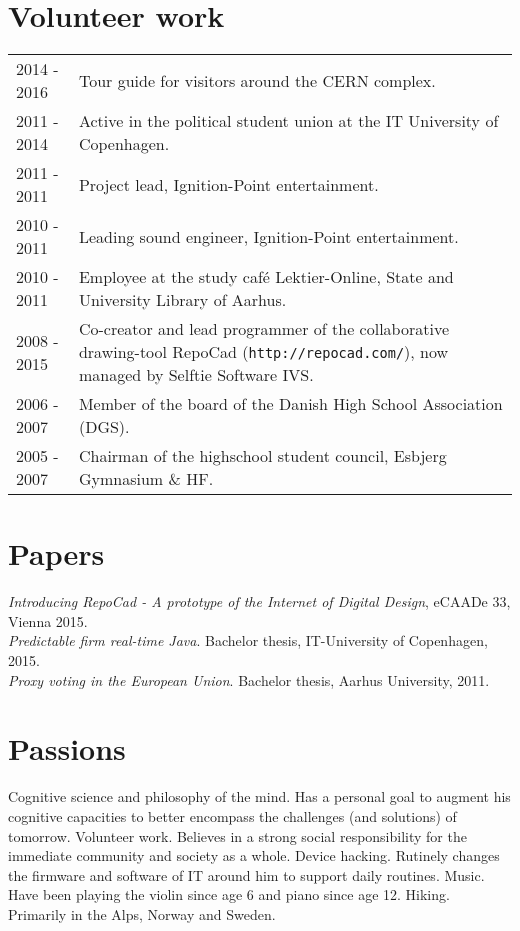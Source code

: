 \documentclass[12pt,a4paper,notitlepage]{article}
\begin{document}
\section*{Volunteer work}
\begin{tabularx}{\textwidth}{l X}
2014 - 2016 & Tour guide for visitors around the CERN complex. \\
2011 - 2014 & Active in the political student union at the IT University of Copenhagen. \\
2011 - 2011 & Project lead, Ignition-Point entertainment. \\
2010 - 2011 & Leading sound engineer, Ignition-Point entertainment. \\
2010 - 2011 & Employee at the study café Lektier-Online, State and University  Library of Aarhus.  \\
2008 - 2015 & Co-creator and lead programmer of the collaborative drawing-tool
              RepoCad (\texttt{http://repocad.com/}), now managed by Selftie Software IVS. \\
2006 - 2007 & Member of the board of the Danish High School Association (DGS). \\
2005 - 2007 & Chairman of the highschool student council, Esbjerg Gymnasium \& HF.
\end{tabularx}

\section*{Papers}
\textit{Introducing RepoCad  - A prototype of the Internet of Digital Design}, eCAADe 33, Vienna 2015. \\
\textit{Predictable firm real-time Java}. Bachelor thesis, IT-University of Copenhagen, 2015. \\
\textit{Proxy voting in the European Union}. Bachelor thesis, Aarhus University, 2011.

\section*{Passions}
Cognitive science and philosophy of the mind. Has a personal goal to augment
his cognitive capacities to better encompass the challenges (and solutions) of tomorrow.
\vskip4pt
\noindent
Volunteer work. Believes in a strong social responsibility for the immediate community and society as a whole.
\vskip4pt
\noindent
Device hacking. Rutinely changes the firmware and software of IT around him
to support daily routines.
\vskip4pt
\noindent
Music. Have been playing the violin since age 6 and piano since age 12.
\vskip4pt
\noindent
Hiking. Primarily in the Alps, Norway and Sweden.
\vskip4pt
\noindent
\end{document}
